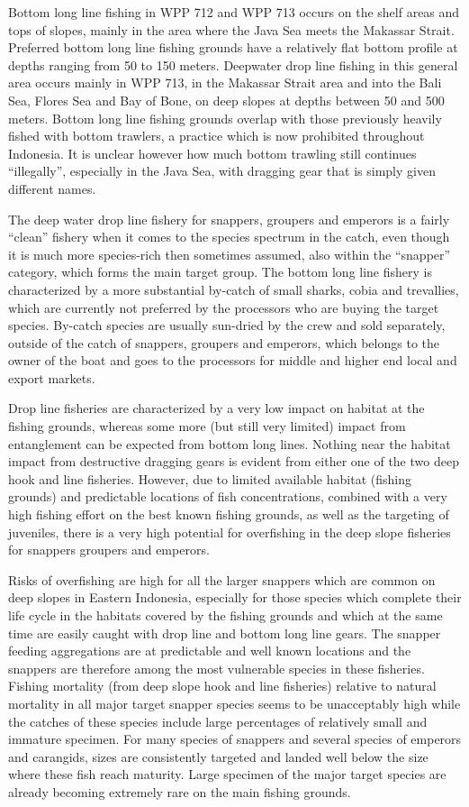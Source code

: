 Bottom long line fishing in WPP 712 and WPP 713 occurs on the shelf areas and tops of slopes, mainly in the area where the Java Sea meets the Makassar Strait. Preferred bottom long line fishing grounds have a relatively flat bottom profile at depths ranging from 50 to 150 meters. Deepwater drop line fishing in this general area occurs mainly in WPP 713, in the Makassar Strait area and into the Bali Sea, Flores Sea and Bay of Bone, on deep slopes at depths between 50 and 500 meters. Bottom long line fishing grounds overlap with those previously heavily fished with bottom trawlers, a practice which is now prohibited throughout Indonesia. It is unclear however how much bottom trawling still continues ``illegally'', especially in the Java Sea, with dragging gear that is simply given different names.

The deep water drop line fishery for snappers, groupers and emperors is a fairly ``clean'' fishery when it comes to the species spectrum in the catch, even though it is much more species-rich then sometimes assumed, also within the ``snapper'' category, which forms the main target group. The bottom long line fishery is characterized by a more substantial by-catch of small sharks, cobia and trevallies, which are currently not preferred by the processors who are buying the target species. By-catch species are usually sun-dried by the crew and sold separately, outside of the catch of snappers, groupers and emperors, which belongs to the owner of the boat and goes to the processors for middle and higher end local and export markets.

Drop line fisheries are characterized by a very low impact on habitat at the fishing grounds, whereas some more (but still very limited) impact from entanglement can be expected from bottom long lines. Nothing near the habitat impact from destructive dragging gears is evident from either one of the two deep hook and line fisheries. However, due to limited available habitat (fishing grounds) and predictable locations of fish concentrations, combined with a very high fishing effort on the best known fishing grounds, as well as the targeting of juveniles, there is a very high potential for overfishing in the deep slope fisheries for snappers groupers and emperors.

Risks of overfishing are high for all the larger snappers which are common on deep slopes in Eastern Indonesia, especially for those species which complete their life cycle in the habitats covered by the fishing grounds and which at the same time are easily caught with drop line and bottom long line gears. The snapper feeding aggregations are at predictable and well known locations and the snappers are therefore among the most vulnerable species in these fisheries. Fishing mortality (from deep slope hook and line fisheries) relative to natural mortality in all major target snapper species seems to be unacceptably high while the catches of these species include large percentages of relatively small and immature specimen. For many species of snappers and several species of emperors and carangids, sizes are consistently targeted and landed well below the size where these fish reach maturity. Large specimen of the major target species are already becoming extremely rare on the main fishing grounds.


